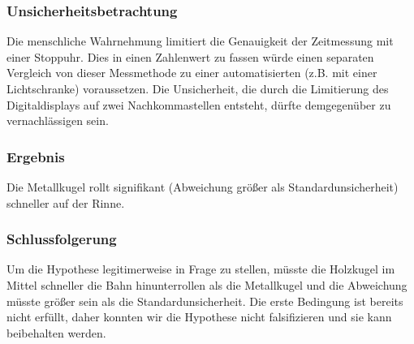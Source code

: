 \documentclass[
	a4paper,
	12pt,
	pagesize,
	ngerman
]{scrartcl}
\begin{document}
	\subsubsection{Unsicherheitsbetrachtung}
	Die menschliche Wahrnehmung limitiert die Genauigkeit der Zeitmessung mit einer Stoppuhr. Dies in einen Zahlenwert zu fassen würde einen separaten Vergleich von dieser Messmethode zu einer automatisierten (z.B. mit einer Lichtschranke) voraussetzen. Die Unsicherheit, die durch die Limitierung des Digitaldisplays auf zwei Nachkommastellen entsteht, dürfte demgegenüber zu vernachlässigen sein.
	\subsubsection{Ergebnis}
	Die Metallkugel rollt signifikant (Abweichung größer als Standardunsicherheit) schneller auf der Rinne.
	\subsubsection{Schlussfolgerung}
	Um die Hypothese legitimerweise in Frage zu stellen, müsste die Holzkugel im Mittel schneller die Bahn hinunterrollen als die Metallkugel und die Abweichung müsste größer sein als die Standardunsicherheit. Die erste Bedingung ist bereits nicht erfüllt, daher konnten wir die Hypothese nicht falsifizieren und sie kann beibehalten werden.
	
	
\end{document}
